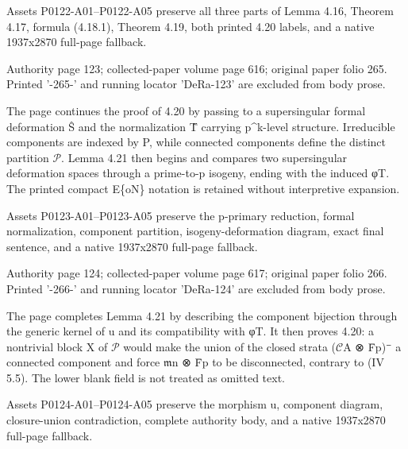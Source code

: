 \documentclass[11pt,a4paper]{article}
\begin{document}
Assets P0122-A01--P0122-A05 preserve all three parts of Lemma 4.16, Theorem 4.17, formula (4.18.1), Theorem 4.19, both printed 4.20 labels, and a native 1937x2870 full-page fallback.


\par\medskip
\hypertarget{D018-P0123}{}
\par\smallskip
Authority page 123; collected-paper volume page 616; original paper folio 265. Printed '-265-' and running locator 'DeRa-123' are excluded from body prose.

The page continues the proof of 4.20 by passing to a supersingular formal deformation Ŝ and the normalization T̂ carrying p\textasciicircum{}k-level structure. Irreducible components are indexed by P, while connected components define the distinct partition \ensuremath{\mathcal{P}}. Lemma 4.21 then begins and compares two supersingular deformation spaces through a prime-to-p isogeny, ending with the induced φ\textunderscore{}T. The printed compact E\textunderscore{}\{oN\} notation is retained without interpretive expansion.

Assets P0123-A01--P0123-A05 preserve the p-primary reduction, formal normalization, component partition, isogeny-deformation diagram, exact final sentence, and a native 1937x2870 full-page fallback.


\par\medskip
\hypertarget{D018-P0124}{}
\par\smallskip
Authority page 124; collected-paper volume page 617; original paper folio 266. Printed '-266-' and running locator 'DeRa-124' are excluded from body prose.

The page completes Lemma 4.21 by describing the component bijection through the generic kernel of u and its compatibility with φ\textunderscore{}T. It then proves 4.20: a nontrivial block X of \ensuremath{\mathcal{P}} would make the union of the closed strata (\ensuremath{\mathcal{C}}\textunderscore{}A ⊗ F̄\textunderscore{}p)⁻ a connected component and force \ensuremath{\mathfrak{m}}\textunderscore{}n ⊗ F̄\textunderscore{}p to be disconnected, contrary to (IV 5.5). The lower blank field is not treated as omitted text.

Assets P0124-A01--P0124-A05 preserve the morphism u, component diagram, closure-union contradiction, complete authority body, and a native 1937x2870 full-page fallback.
\end{document}

